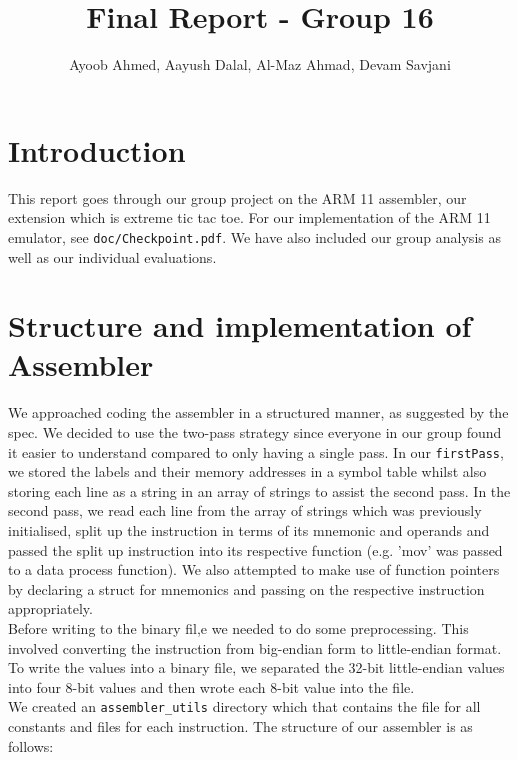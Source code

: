 \documentclass[10pt]{article}
\begin{document}
\title{\vspace{-2cm}Final Report - Group 16}
\author{Ayoob Ahmed, Aayush Dalal, Al-Maz Ahmad, Devam Savjani}


\maketitle
\section{Introduction}
This report goes through our group project on the ARM 11 assembler, our extension which is extreme tic tac toe. For our implementation of the ARM 11 emulator, see {\tt{doc/Checkpoint.pdf}}. We have also included our group analysis as well as our individual evaluations.

\section{Structure and implementation of Assembler}
We approached coding the assembler in a structured manner, as suggested by the spec. We decided to use the two-pass strategy since everyone in our group found it easier to understand compared to only having a single pass. In our {\tt{firstPass}}, we stored the labels and their memory addresses in a symbol table whilst also storing each line as a string in an array of strings to assist the second pass. In the second pass, we read each line from the array of strings which was previously initialised, split up the instruction in terms of its mnemonic and operands and passed the split up instruction into its respective function (e.g. 'mov' was passed to a data process function). We also attempted to make use of function pointers by declaring a struct for mnemonics and passing on the respective instruction appropriately.
\\Before writing to the binary fil,e we needed to do some preprocessing. This involved converting the instruction from big-endian form to little-endian format. To write the values into a binary file, we separated the 32-bit little-endian values into four 8-bit values and then wrote each 8-bit value into the file.
\\ We created an {\tt{assembler\_utils}} directory which that contains the file for all constants and files for each instruction. The structure of our assembler is as follows:
\end{document}
